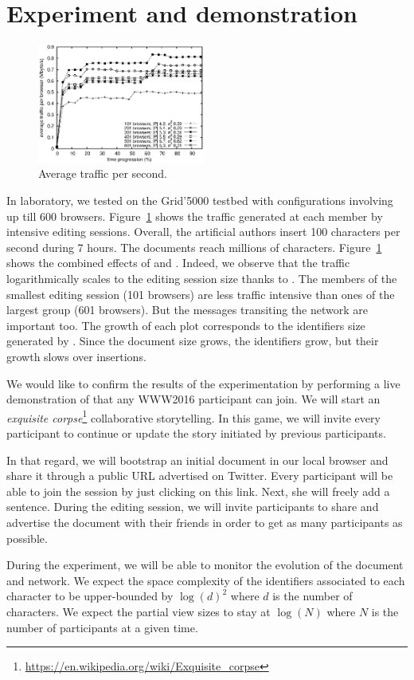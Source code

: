 
\section{Experiment and demonstration}
\label{sec:live}

\begin{figure}
  \centering
  \includegraphics[width=0.49\textwidth]{img/traffic.eps}
  \caption{\label{fig:traffic}Average traffic per second.}
\end{figure}

In laboratory, we tested \CRATE on the Grid'5000 testbed with configurations
involving up till 600 browsers. Figure~\ref{fig:traffic} shows the traffic
generated at each member by intensive editing sessions. Overall, the artificial
authors insert 100 characters per second during 7 hours. The documents reach
millions of characters. Figure~\ref{fig:traffic} shows the combined effects of
\SPRAY and \LSEQ. Indeed, we observe that the traffic logarithmically scales to
the editing session size thanks to \SPRAY. The members of the smallest editing
session (101 browsers) are less traffic intensive than ones of the largest group
(601 browsers).  But the messages transiting the network are important too. The
growth of each plot corresponds to the identifiers size generated by
\LSEQ. Since the document size grows, the identifiers grow, but their growth
slows over insertions.

We would like to confirm the results of the experimentation by performing a live
demonstration of \CRATE that any WWW2016 participant can join. We will start an
\emph{exquisite
  corpse}\footnote{\url{https://en.wikipedia.org/wiki/Exquisite_corpse}}
collaborative storytelling. In this game, we will invite every participant to
continue or update the story initiated by previous participants.

In that regard, we will bootstrap an initial document in our local browser and
share it through a public URL advertised on Twitter. Every participant will be
able to join the session by just clicking on this link. Next, she will freely
add a sentence. During the editing session, we will invite participants to share
and advertise the document with their friends in order to get as many
participants as possible.

During the experiment, we will be able to monitor the evolution of the document
and network. We expect the space complexity of the identifiers associated to
each character to be upper-bounded by $\log(d)^2$ where $d$ is the number of
characters. We expect the partial view sizes to stay at $\log(N)$ where $N$ is
the number of participants at a given time.

